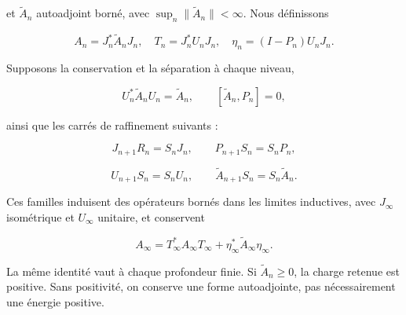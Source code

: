 et \(\widetilde A_n\) autoadjoint borné, avec \(\sup_n\|\widetilde A_n\|<\infty\). Nous définissons

\[
A_n=J_n^*\widetilde A_nJ_n,\quad
T_n=J_n^*U_nJ_n,\quad
\eta_n=(I-P_n)U_nJ_n.
\]

Supposons la conservation et la séparation à chaque niveau,

\begin{equation}
U_n^*\widetilde A_nU_n=\widetilde A_n,
\qquad [\widetilde A_n,P_n]=0,
\label{x_reciprocidad:nuc01:eq:8}
\end{equation}

ainsi que les carrés de raffinement suivants :

\begin{equation}
J_{n+1}R_n=S_nJ_n,\qquad
P_{n+1}S_n=S_nP_n,
\label{x_reciprocidad:nuc01:eq:9}
\end{equation}

\begin{equation}
U_{n+1}S_n=S_nU_n,\qquad
\widetilde A_{n+1}S_n=S_n\widetilde A_n.
\label{x_reciprocidad:nuc01:eq:10}
\end{equation}

\begin{theorem}
Ces familles induisent des opérateurs bornés dans les limites inductives, avec \(J_\infty\) isométrique et \(U_\infty\) unitaire, et conservent

\begin{equation}
A_\infty
=T_\infty^*A_\infty T_\infty
 +\eta_\infty^*\widetilde A_\infty\eta_\infty.
\label{x_reciprocidad:nuc01:eq:11}
\end{equation}

La même identité vaut à chaque profondeur finie. Si \(\widetilde A_n\geq0\), la charge retenue est positive. Sans positivité, on conserve une forme autoadjointe, pas nécessairement une énergie positive.
\end{theorem}

